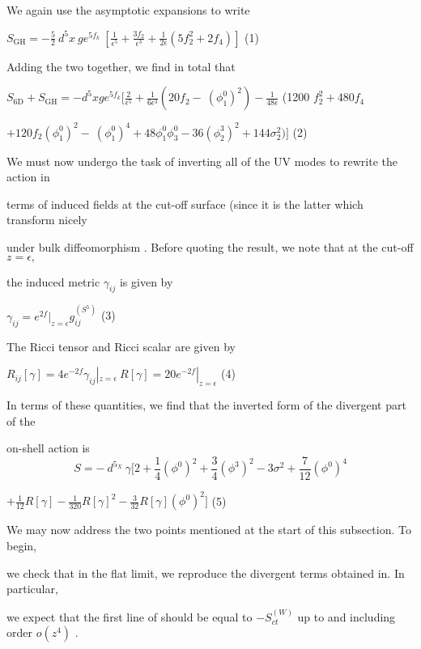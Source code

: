 \documentclass[a4paper,12pt]{article}
\begin{document}
We again use the asymptotic expansions to write
\begin{center}
$S_{\mathrm{G}\mathrm{H}}=-\displaystyle \frac{5}{2}\ d^{5}x\ ge^{5f_{k}}\ [\frac{1}{\epsilon^{5}}+\frac{3f_{2}}{\epsilon^{3}}+\frac{1}{2\epsilon}(5f_{2}^{2}+2f_{4})]$   (1)
\end{center}
Adding the two together, we find in total that

$S_{6\mathrm{D}}+S_{\mathrm{G}\mathrm{H}}=- d^{5}x ge^{5f_{k}} [\displaystyle \frac{2}{\epsilon^{5}}+\frac{1}{6\epsilon^{3}} (20f_{2}-\ (\phi_{1}^{0})^{2}) -\displaystyle \frac{1}{48\epsilon}$ (1200 $f_{2}^{2}+480f_{4}$
\begin{center}
$+120f_{2}(\phi_{1}^{0})^{2}-\ (\phi_{1}^{0})^{4}+48\phi_{1}^{0}\phi_{3}^{0}-36(\phi_{2}^{3})^{2}+144\sigma_{2}^{2})]$   (2)
\end{center}
We must now undergo the task of inverting all of the UV modes to rewrite the action in

terms of induced fields at the cut-off surface (since it is the latter which transform nicely

under bulk diffeomorphism . Before quoting the result, we note that at the cut-off $z = \epsilon,$

the induced metric $\gamma_{ij}$ is given by
\begin{center}
$\gamma_{ij}=e^{2f}|_{z=\epsilon}g_{ij}^{(S^{5})}$   (3)
\end{center}
The Ricci tensor and Ricci scalar are given by
\begin{center}
$R_{ij}[\gamma]=4e^{-2f}\gamma_{ij}|_{z=\epsilon}\ R[\gamma]=20e^{-2f}|_{z=\epsilon}$   (4)
\end{center}
In terms of these quantities, we find that the inverted form of the divergent part of the

on-shell action is
$$
S=-\ d^{5_{X}}\ \gamma[2+\frac{1}{4}(\phi^{0})^{2}+\frac{3}{4}(\phi^{3})^{2}-3\sigma^{2}+\frac{7}{12}(\phi^{0})^{4}
$$
\begin{center}
$+\displaystyle \frac{1}{12}R[\gamma]-\frac{1}{320}R[\gamma]^{2}-\frac{3}{32}R[\gamma](\phi^{0})^{2}]$   (5)
\end{center}
We may now address the two points mentioned at the start of this subsection. To begin,

we check that in the flat limit, we reproduce the divergent terms obtained in. In particular,

we expect that the first line of should be equal to $-S_{ct}^{(W)}$ up to and including order $o(z^{4})$ .
\end{document}

